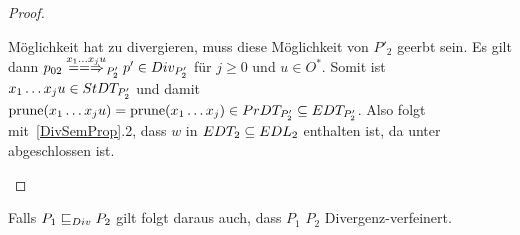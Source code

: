 \begin{proof}
\begin{itemize}
\begin{itemize}
          Möglichkeit hat zu divergieren, muss diese Möglichkeit von $P'_2$
          geerbt sein. Es gilt dann $p_{02} \lweakmay[x_1\dots x_j u]_{P'_2} p'
          \in Div _{P'_2}$ für $j\geq 0$ und $u\in O^*$. Somit ist $x_1\dots
          x_j u\in StDT _{P'_2}$ und damit $\mathrm{prune} (x_1\dots x_j u) = \mathrm{prune}
          (x_1\dots x_j)\in PrDT _{P'_2}\subseteq EDT _{P'_2}$. Also folgt
          mit~\ref{DivSemProp}.2, dass $w$ in $EDT _2 \subseteq EDL _2$
          enthalten ist, da \DT{} unter \cont{} abgeschlossen ist.
      \end{itemize}
  \end{itemize}
\end{proof}

\begin{Satz}
  \label{DivTestVerfSatz}
  Falls $P_1  \sqsubseteq  _{Div} P_2$ gilt folgt daraus auch, dass $P_1$ $P_2$
  Divergenz-verfeinert.
\end{Satz}

